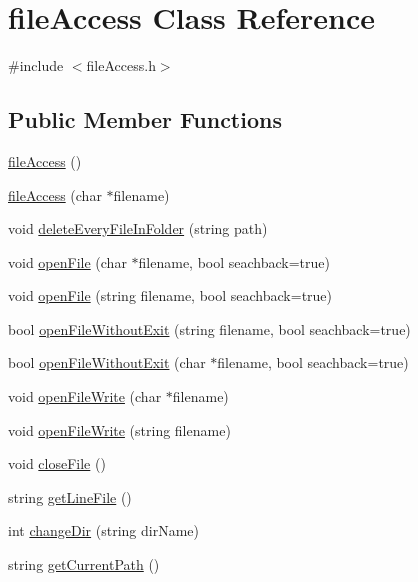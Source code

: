 \hypertarget{classfile_access}{
\section{fileAccess Class Reference}
\label{classfile_access}
}


{\ttfamily \#include $<$fileAccess.h$>$}\subsection*{Public Member Functions}
\begin{DoxyCompactItemize}
\item 
\hyperlink{classfile_access_aa112e7752992f91e0618d2f248fdfe84}{fileAccess} ()
\item 
\hyperlink{classfile_access_a0cecedbce3972f8a5f8b8978636a3762}{fileAccess} (char $\ast$filename)
\item 
void \hyperlink{classfile_access_aca9252b340bdee9f65ea5d6cc35f2a22}{deleteEveryFileInFolder} (string path)
\item 
void \hyperlink{classfile_access_a9ae5080911deee1e5835f32cabf1f995}{openFile} (char $\ast$filename, bool seachback=true)
\item 
void \hyperlink{classfile_access_a943643352e709aec761f13b1705651d4}{openFile} (string filename, bool seachback=true)
\item 
bool \hyperlink{classfile_access_a1b06d07c8fb0c7840ecf8c116f3b23ae}{openFileWithoutExit} (string filename, bool seachback=true)
\item 
bool \hyperlink{classfile_access_af641cf749d3f1fcc48bf18c4b9bee630}{openFileWithoutExit} (char $\ast$filename, bool seachback=true)
\item 
void \hyperlink{classfile_access_a524de46eb27d5f5397c67befbf5bdd62}{openFileWrite} (char $\ast$filename)
\item 
void \hyperlink{classfile_access_a2a12db6db45d3520a82e7dec49723121}{openFileWrite} (string filename)
\item 
void \hyperlink{classfile_access_a60efd458becc18c4a4a71033ac8f2a9c}{closeFile} ()
\item 
string \hyperlink{classfile_access_a0fdde34d2a4dac424a6dfbfb95e84102}{getLineFile} ()
\item 
int \hyperlink{classfile_access_a67d1cb63b2ec197b07175984c3cc6419}{changeDir} (string dirName)
\item 
string \hyperlink{classfile_access_a39b158208424b8cfb167bc93ce30a351}{getCurrentPath} ()
\item 

\end{DoxyCompactItemize}

